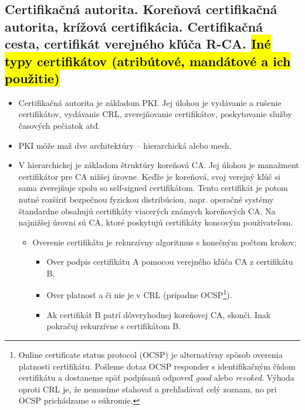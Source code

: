\documentclass[12pt,a4paper]{article}
\begin{document}
{    \subsection{Certifikačná autorita. Koreňová certifikačná autorita, krížová certifikácia. Certifikačná cesta, certifikát verejného kľúča R-CA. \hl{Iné typy certifikátov (atribútové, mandátové a ich použitie)}}
    \begin{itemize}
        \item Certifikačná autorita je základom PKI. Jej úlohou je vydávanie a rušenie certifikátov, vydávanie CRL, zverejňovanie certifikátov, poskytovanie služby časových pečiatok atď.
        \item PKI môže maž dve architektúry -- hierarchická alebo mesh. 
        \item V hierarchickej je základom štruktúry koreňová CA. Jej úlohou je manažment certifikátor pre CA nižšej úrovne. Keďže je koreňová, svoj verejný kľúč si sama zverejňuje spolu so self-signed certifikátom. Tento certifikát je potom nutné rozšíriť bezpečnou fyzickou distribúciou, napr. operačné systémy štandardne obsahujú certifikáty viacerých známych koreňových CA. Na najnižšej úrovni sú CA, ktoré poskytujú certifikáty koncovým používateľom.
        \begin{itemize}
            \item Overenie certifikátu je rekurzívny algoritmus s konečným počtom krokov:
            \begin{itemize}
                \item Over podpis certifikátu A pomocou verejného kľúča CA z certifikátu B.
                \item Over platnosť a či nie je v CRL (prípadne OCSP\footnote{Online certificate status protocol (OCSP) je alternatívny spôsob overenia platnosti certifikátu. Pošleme dotaz OCSP responder s identifikačným číslom certifikátu a dostaneme späť podpísanú odpoveď \textit{good} alebo \textit{revoked}. Výhoda oproti CRL je, že nemusíme sťahovať a prehľadávať celý zoznam, no pri OCSP prichádzame o súkromie.}).
                \item Ak certifikát B patrí dôveryhodnej koreňovej CA, skonči. Inak pokračuj rekurzívne s certifikátom B.
            \end{itemize}
        \end{itemize}
        \begin{figure}[htbp]
            \centering
            \begin{tikzpicture}[
              cert/.style={draw, rounded corners, minimum width=3.5cm, minimum height=1.5cm, align=center},
              arrow/.style={->, thick}
            ]
            

\end{tikzpicture}
\end{figure}
\end{itemize}}
\end{document}
